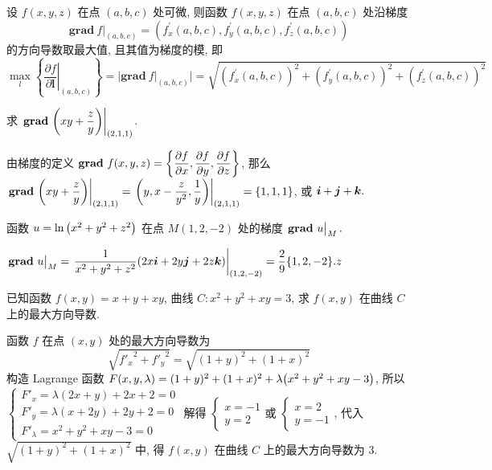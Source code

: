 \begin{theorem}[方向导数与梯度的关系]
    设 $ f(x, y, z) $ 在点 $ (a, b, c) $ 处可微, 则函数 $ f(x, y, z) $ 在点 $ (a, b, c) $ 处沿梯度
    $$\left.\mathbf{grad}~ f\right|_{(a, b, c)}=\left(f_{x}^{\prime}(a, b, c), f_{y}^{\prime}(a, b, c), f_{z}^{\prime}(a, b, c)\right)$$
    的方向导数取最大值, 且其值为梯度的模, 即
    $$\max _{l}\left\{\left.\frac{\partial f}{\partial \boldsymbol{l}}\right|_{(a, b, c)}\right\}=|\mathbf{grad}~ f|_{(a, b, c)} \mid =\sqrt{\left(f_{x}^{\prime}(a, b, c)\right)^{2}+\left(f_{y}^{\prime}(a, b, c)\right)^{2}+\left(f_{z}^{\prime}(a, b, c)\right)^{2}}$$
\end{theorem}

\begin{example}[2012 数一]
    求 $\eval{\mathbf{grad}~\qty(xy+\dfrac{z}{y})}_{(2,1,1)}$.
\end{example}
\begin{solution}
    由梯度的定义 $\displaystyle\mathbf{grad}~f(x,y,z)=\qty{\pdv{f}{x},\pdv{f}{y},\pdv{f}{z}}$, 那么
    $\eval{\mathbf{grad}~\qty(xy+\dfrac{z}{y})}_{(2,1,1)}=\eval{\qty(y,x-\dfrac{z}{y^2},\dfrac{1}{y})}_{(2,1,1)}=\qty{1,1,1}$, 或 $\vb*{i}+\vb*{j}+\vb*{k}.$
\end{solution}

\begin{example}[1992 数一]
    函数 $u=\ln\qty(x^2+y^2+z^2)$ 在点 $M(1,2,-2)$ 处的梯度 $\eval{\mathbf{grad}~u}_{M}.$
\end{example}
\begin{solution}
    $\eval{\mathbf{grad}~u}_{M}=\eval{\dfrac{1}{x^2+y^2+z^2}(2x\vb*{i}+2y\vb*{j}+2z\vb*{k})}_{(1,2,-2)}=\dfrac{2}{9}\qty{1,2,-2}.z$
\end{solution}

\begin{example}[2015 数一]
    已知函数 $f(x,y)=x+y+xy$, 曲线 $C:x^2+y^2+xy=3$, 求 $f(x,y)$ 在曲线 $C$ 上的最大方向导数.
\end{example}
\begin{solution}
    函数 $f$ 在点 $(x,y)$ 处的最大方向导数为 $$\sqrt{{f'_x}^2+{f'_y}^2}=\sqrt{(1+y)^2+(1+x)^2}$$
    构造 Lagrange 函数 $F(x,y,\lambda)=(1+y)^2+(1+x)^2+\lambda\qty(x^2+y^2+xy-3)$, 所以 
    $\begin{cases}
        F'_x=\lambda (2 x + y) + 2 x + 2=0\\ 
        F'_y=\lambda (x + 2 y) + 2 y + 2=0\\ 
        F'_\lambda=x^2+y^2+xy-3=0
    \end{cases}$ 解得 $\begin{cases}
        x=-1\\ y=2
    \end{cases}\text{或 }\begin{cases}
        x=2\\ y=-1
    \end{cases}$, 代入 $\sqrt{(1+y)^2+(1+x)^2}$ 中, 得 $f(x,y)$  在曲线 $C$ 上的最大方向导数为 $3$.
\end{solution}

